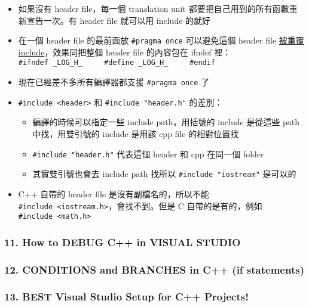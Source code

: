 \documentclass[11pt]{article}
\providecommand{\tightlist}{%
      \setlength{\itemsep}{0pt}\setlength{\parskip}{0pt}}
\begin{document}
\begin{itemize}
\tightlist
\item
  如果沒有 header file，每一個 translation unit
  都要把自己用到的所有函數重新宣告一次。有 header file 就可以用 include
  的就好
\item
  在一個 header file 的最前面放 \texttt{\#pragma\ once} 可以避免這個
  header file
  \href{https://en.wikipedia.org/wiki/Pragma_once\#Example}{被重覆
  include}，效果同把整個 header file 的內容包在 ifndef 裡：
  \texttt{\#ifndef\ \_LOG\_H\_\ \ \ \ \ \#define\ \_LOG\_H\_\ \ \ \ \ \#endif}
\item
  現在已經差不多所有編譯器都支援 \texttt{\#pragma\ once} 了
\item
  \texttt{\#include\ \textless{}header\textgreater{}} 和
  \texttt{\#include\ "header.h"} 的差別：

  \begin{itemize}
  \tightlist
  \item
    編譯的時候可以指定一些 include path，用括號的 include 是從這些 path
    中找，用雙引號的 include 是用該 cpp file 的相對位置找
  \item
    \texttt{\#include\ "header.h"} 代表這個 header 和 cpp 在同一個
    folder
  \item
    其實雙引號也會去 include path 找所以 \texttt{\#include\ "iostream"}
    是可以的
  \end{itemize}
\item
  C++ 自帶的 header file 是沒有副檔名的，所以不能
  \texttt{\#include\ \textless{}iostream.h\textgreater{}}，會找不到。但是
  C 自帶的是有的，例如
  \texttt{\#include\ \textless{}math.h\textgreater{}}
\end{itemize}

\hypertarget{how-to-debug-c-in-visual-studio}{%
\subsubsection{11. How to DEBUG C++ in VISUAL
STUDIO}\label{how-to-debug-c-in-visual-studio}}

\hypertarget{conditions-and-branches-in-c-if-statements}{%
\subsubsection{12. CONDITIONS and BRANCHES in C++ (if
statements)}\label{conditions-and-branches-in-c-if-statements}}

\hypertarget{best-visual-studio-setup-for-c-projects}{%
\subsubsection{13. BEST Visual Studio Setup for C++
Projects!}\label{best-visual-studio-setup-for-c-projects}}
\end{document}
